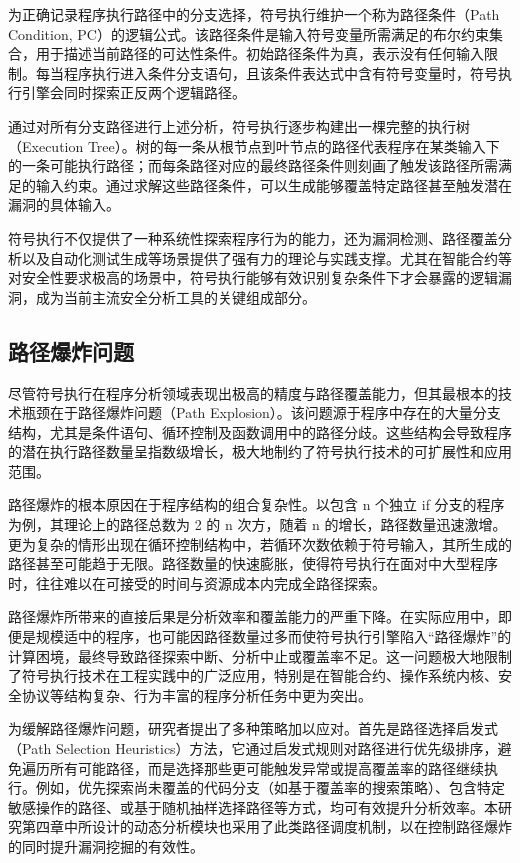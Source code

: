 \documentclass[print, master, vlined, timesmath]{DissertUESTC}
\begin{document}
为正确记录程序执行路径中的分支选择，符号执行维护一个称为路径条件（Path Condition, PC）的逻辑公式。该路径条件是输入符号变量所需满足的布尔约束集合，用于描述当前路径的可达性条件。初始路径条件为真，表示没有任何输入限制。每当程序执行进入条件分支语句，且该条件表达式中含有符号变量时，符号执行引擎会同时探索正反两个逻辑路径。

通过对所有分支路径进行上述分析，符号执行逐步构建出一棵完整的执行树（Execution Tree）。树的每一条从根节点到叶节点的路径代表程序在某类输入下的一条可能执行路径；而每条路径对应的最终路径条件则刻画了触发该路径所需满足的输入约束。通过求解这些路径条件，可以生成能够覆盖特定路径甚至触发潜在漏洞的具体输入。

符号执行不仅提供了一种系统性探索程序行为的能力，还为漏洞检测、路径覆盖分析以及自动化测试生成等场景提供了强有力的理论与实践支撑。尤其在智能合约等对安全性要求极高的场景中，符号执行能够有效识别复杂条件下才会暴露的逻辑漏洞，成为当前主流安全分析工具的关键组成部分。

\subsection{路径爆炸问题}

尽管符号执行在程序分析领域表现出极高的精度与路径覆盖能力，但其最根本的技术瓶颈在于路径爆炸问题（Path Explosion）。该问题源于程序中存在的大量分支结构，尤其是条件语句、循环控制及函数调用中的路径分歧。这些结构会导致程序的潜在执行路径数量呈指数级增长，极大地制约了符号执行技术的可扩展性和应用范围。

路径爆炸的根本原因在于程序结构的组合复杂性。以包含 n 个独立 if 分支的程序为例，其理论上的路径总数为 2 的 n 次方，随着 n 的增长，路径数量迅速激增。更为复杂的情形出现在循环控制结构中，若循环次数依赖于符号输入，其所生成的路径甚至可能趋于无限。路径数量的快速膨胀，使得符号执行在面对中大型程序时，往往难以在可接受的时间与资源成本内完成全路径探索。

路径爆炸所带来的直接后果是分析效率和覆盖能力的严重下降。在实际应用中，即便是规模适中的程序，也可能因路径数量过多而使符号执行引擎陷入“路径爆炸”的计算困境，最终导致路径探索中断、分析中止或覆盖率不足。这一问题极大地限制了符号执行技术在工程实践中的广泛应用，特别是在智能合约、操作系统内核、安全协议等结构复杂、行为丰富的程序分析任务中更为突出。

为缓解路径爆炸问题，研究者提出了多种策略加以应对。首先是路径选择启发式\textsuperscript{\cite{Chen2018dynamic}}（Path Selection Heuristics）方法，它通过启发式规则对路径进行优先级排序，避免遍历所有可能路径，而是选择那些更可能触发异常或提高覆盖率的路径继续执行。例如，优先探索尚未覆盖的代码分支（如基于覆盖率的搜索策略）、包含特定敏感操作的路径、或基于随机抽样选择路径等方式，均可有效提升分析效率。本研究第四章中所设计的动态分析模块也采用了此类路径调度机制，以在控制路径爆炸的同时提升漏洞挖掘的有效性。
\end{document}

